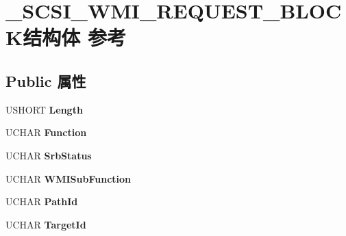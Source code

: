 \hypertarget{struct___s_c_s_i___w_m_i___r_e_q_u_e_s_t___b_l_o_c_k}{}\section{\+\_\+\+S\+C\+S\+I\+\_\+\+W\+M\+I\+\_\+\+R\+E\+Q\+U\+E\+S\+T\+\_\+\+B\+L\+O\+C\+K结构体 参考}
\label{struct___s_c_s_i___w_m_i___r_e_q_u_e_s_t___b_l_o_c_k}
\subsection*{Public 属性}
\begin{DoxyCompactItemize}
\item 
\mbox{\label{struct___s_c_s_i___w_m_i___r_e_q_u_e_s_t___b_l_o_c_k_a710ca32e189a8fd64ab3d56eca855f19}} 
U\+S\+H\+O\+RT {\bfseries Length}
\item 
\mbox{\label{struct___s_c_s_i___w_m_i___r_e_q_u_e_s_t___b_l_o_c_k_af01839a5043d95a699c8c77cbbcd654d}} 
U\+C\+H\+AR {\bfseries Function}
\item 
\mbox{\label{struct___s_c_s_i___w_m_i___r_e_q_u_e_s_t___b_l_o_c_k_a52801976124be4b6053b02067d059266}} 
U\+C\+H\+AR {\bfseries Srb\+Status}
\item 
\mbox{\label{struct___s_c_s_i___w_m_i___r_e_q_u_e_s_t___b_l_o_c_k_a19923e347488b30fa3b8cb2be2f0253a}} 
U\+C\+H\+AR {\bfseries W\+M\+I\+Sub\+Function}
\item 
\mbox{\label{struct___s_c_s_i___w_m_i___r_e_q_u_e_s_t___b_l_o_c_k_afe4703066638aa88e22d9a8c7c33246e}} 
U\+C\+H\+AR {\bfseries Path\+Id}
\item 
\mbox{\label{struct___s_c_s_i___w_m_i___r_e_q_u_e_s_t___b_l_o_c_k_aa8e6e05b12d3341c0e099fbca1f9e776}} 
U\+C\+H\+AR {\bfseries Target\+Id}
\item 
\mbox{\label{struct___s_c_s_i___w_m_i___r_e_q_u_e_s_t___b_l_o_c_k_af8b8c143a78f1cd3101ebfaf7eecfb1f}} 

\end{DoxyCompactItemize}
